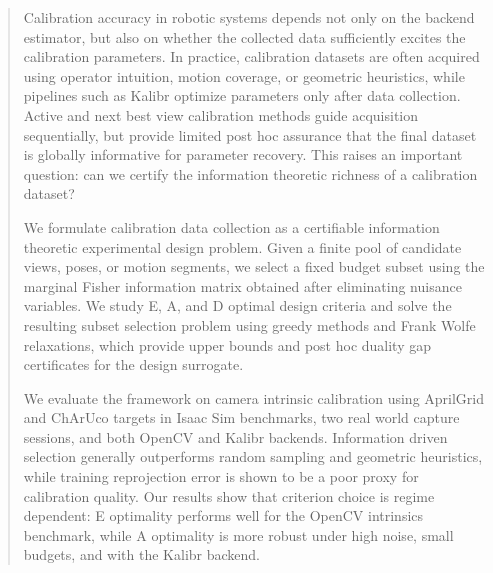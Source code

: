 \documentclass[letterpaper, 9
 pt, conference]{ieeeconf}
\begin{document}

\begin{abstract}
Calibration accuracy in robotic systems depends not only on the backend estimator, but also on whether the collected data sufficiently excites the calibration parameters. In practice, calibration datasets are often acquired using operator intuition, motion coverage, or geometric heuristics, while pipelines such as Kalibr optimize parameters only after data collection. Active and next best view calibration methods guide acquisition sequentially, but provide limited post hoc assurance that the final dataset is globally informative for parameter recovery. This raises an important question: can we certify the information theoretic richness of a calibration dataset?

We formulate calibration data collection as a certifiable information theoretic experimental design problem. Given a finite pool of candidate views, poses, or motion segments, we select a fixed budget subset using the marginal Fisher information matrix obtained after eliminating nuisance variables. We study E, A, and D optimal design criteria and solve the resulting subset selection problem using greedy methods and Frank Wolfe relaxations, which provide upper bounds and post hoc duality gap certificates for the design surrogate.

We evaluate the framework on camera intrinsic calibration using AprilGrid and ChArUco targets in Isaac Sim benchmarks, two real world capture sessions, and both OpenCV and Kalibr backends. Information driven selection generally outperforms random sampling and geometric heuristics, while training reprojection error is shown to be a poor proxy for calibration quality. Our results show that criterion choice is regime dependent: E optimality performs well for the OpenCV intrinsics benchmark, while A optimality is more robust under high noise, small budgets, and with the Kalibr backend.
\end{abstract}
\end{document}
